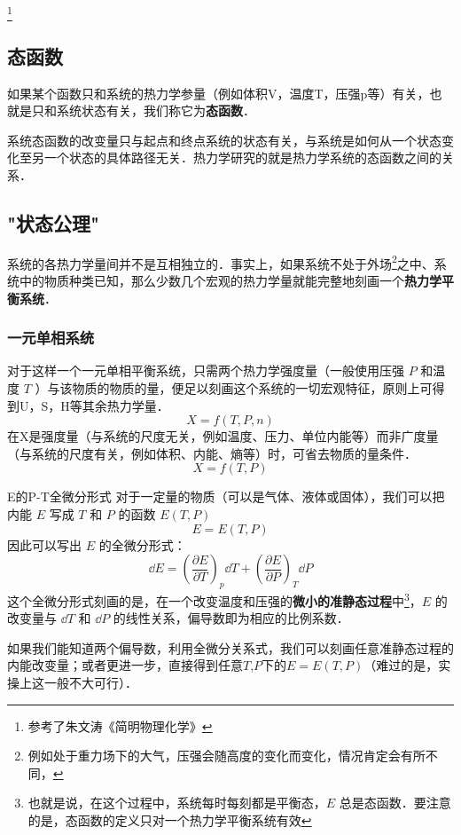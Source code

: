 \footnote{参考了朱文涛《简明物理化学》}

\subsection{态函数}
如果某个函数只和系统的热力学参量（例如体积V，温度T，压强p等）有关，也就是只和系统状态有关，我们称它为\textbf{态函数}．

系统态函数的改变量只与起点和终点系统的状态有关，与系统是如何从一个状态变化至另一个状态的具体路径无关．热力学研究的就是热力学系统的态函数之间的关系．

\subsection{"状态公理"}
系统的各热力学量间并不是互相独立的．事实上，如果系统不处于外场\footnote{例如处于重力场下的大气，压强会随高度的变化而变化，情况肯定会有所不同，}之中、系统中的物质种类已知，那么少数几个宏观的热力学量就能完整地刻画一个\textbf{热力学平衡系统}．

\subsubsection{一元单相系统}
对于这样一个一元单相平衡系统，只需两个热力学强度量（一般使用压强 $P$ 和温度 $T$ ）与该物质的物质的量，便足以刻画这个系统的一切宏观特征，原则上可得到U，S，H等其余热力学量．
\begin{equation}
X=f(T,P,n)
\end{equation}
在X是强度量（与系统的尺度无关，例如温度、压力、单位内能等）而非广度量（与系统的尺度有关，例如体积、内能、熵等）时，可省去物质的量条件．
\begin{equation}
X=f(T,P)
\end{equation}

\begin{example}{E的P-T全微分形式}
对于一定量的物质（可以是气体、液体或固体），我们可以把内能 $E$ 写成 $T$ 和 $P$ 的函数 $E(T,P)$
\begin{equation}
E=E(T,P)
\end{equation}
因此可以写出 $E$ 的全微分形式：
\begin{equation}
\dd E=\left(\frac{\partial E}{\partial T}\right)_p \dd T + \left(\frac{\partial E}{\partial P}\right)_T \dd P
\end{equation}
这个全微分形式刻画的是，在一个改变温度和压强的\textbf{微小的准静态过程}中\footnote{也就是说，在这个过程中，系统每时每刻都是平衡态，$E$ 总是态函数．要注意的是，态函数的定义只对一个热力学平衡系统有效}，$E$ 的改变量与 $\dd T$ 和 $\dd P$ 的线性关系，偏导数即为相应的比例系数．

如果我们能知道两个偏导数，利用全微分关系式，我们可以刻画任意准静态过程的内能改变量；或者更进一步，直接得到任意$T$,$P$下的$E=E(T,P)$（难过的是，实操上这一般不大可行）．
\end{example}

